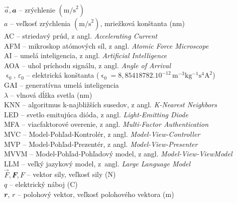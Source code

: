 %
%

$\vec{a}, \mathbfit{a}$ -- zrýchlenie $(\mathrm{m/s}^2)$\\
$a$ -- veľkosť zrýchlenia $(\mathrm{m/s}^2)$, mriežková konštanta (nm)\\
AC -- striedavý prúd, z angl. \emph{\foreignlanguage{english}{Accelerating Current}}\\
AFM -- mikroskop atómových síl, z angl. \emph{\foreignlanguage{english}{Atomic Force Microscope}}\\
AI -- umelá inteligencia, z angl. \emph{\foreignlanguage{english}{Artificial Intelligence}}\\
AOA -- uhol príchodu signálu, z angl. \emph{\foreignlanguage{english}{Angle of Arrival}}\\
$\upvarepsilon_0$, $\varepsilon_0$ -- elektrická konštanta ($\upvarepsilon_0 = 8{,}85418782\mathbin.10^{-12}\,\mathrm{m^{-3} kg^{-1} s^4 A^2}$)\\
GAI -- generatívna umelá inteligencia\\
$\lambda$ -- vlnová dĺžka svetla (nm)\\
KNN -- algoritmus k-najbližších susedov, z angl. \emph{\foreignlanguage{english}{K-Nearest Neighbors}}\\
LED -- svetlo emitujúca dióda, z angl. \emph{\foreignlanguage{english}{Light-Emitting Diode}}\\
MFA -- viacfaktorové overenie, z angl. \emph{\foreignlanguage{english}{Multi-Factor Authentication}}\\
MVC -- Model-Pohľad-Kontrolér, z angl. \emph{\foreignlanguage{english}{Model-View-Controller}}\\
MVP -- Model-Pohľad-Prezentér, z angl. \emph{\foreignlanguage{english}{Model-View-Presenter}}\\
MVVM -- Model-Pohľad-Pohľadový model, z angl. \emph{\foreignlanguage{english}{Model-View-ViewModel}}\\
LLM -- veľký jazykový model, z~angl. \emph{\foreignlanguage{english}{Large Language Model}}\\
$\vec{F}, \mathbfit{F}, F$ – vektor sily, veľkosť sily (N)\\
$q$ -- elektrický náboj (C)\\
$\mathbfit r$, $r$ -- polohový vektor, veľkosť polohového vektora (m)\\
